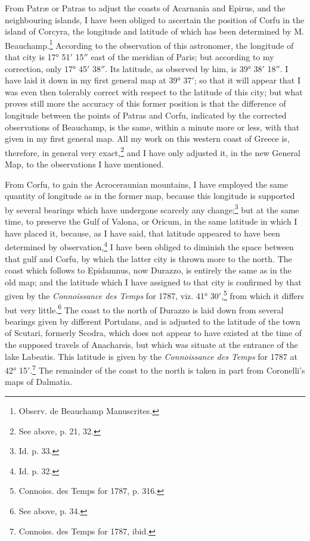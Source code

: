 \documentclass[a4paper, 11pt, oneside, polutonikogreek, english]{article}
\begin{document}
From Patræ or Patras to adjust the coasts of Acarnania and Epirus, and the neighbouring islands, I have been obliged to ascertain the position of Corfu in the island of Corcyra, the longitude and latitude of which has been determined by M. Beauchamp.\footnote{Observ. de Beauchamp Manuscrites.} According to the observation of this astronomer, the longitude of that city is 17° 51$'$ 15$''$ east of the meridian of Paris; but according to my correction, only 17° 45$'$ 38$''$. Its latitude, as observed by him, is 39° 38$'$ 18$''$. I have laid it down in my first general map at 39° 37$'$; so that it will appear that I was even then tolerably correct with respect to the latitude of this city; but what proves still more the accuracy of this former position is that the difference of longitude between the points of Patras and Corfu, indicated by the corrected observations of Beauchamp, is the same, within a minute more or less, with that given in my first general map. All my work on this western coast of Greece is, therefore, in general very exact,\footnote{See above, p. 21, 32.} and I have only adjusted it, in the new General Map, to the observations I have mentioned.

From Corfu, to gain the Acroceraunian mountains, I have employed the same quantity of longitude as in the former map, because this longitude is supported by several bearings which have undergone scarcely any change;\footnote{Id. p. 33.} but at the same time, to preserve the Gulf of Valona, or Oricum, in the same latitude in which I have placed it, because, as I have said, that latitude appeared to have been determined by observation,\footnote{Id. p. 32.} I have been obliged to diminish the space between that gulf and Corfu, by which the latter city is thrown more to the north. The coast which follows to Epidamnus, now Durazzo, is entirely the same as in the old map; and the latitude which I have assigned to that city is confirmed by that given by the \emph{Connoissance des Temps} for 1787, viz. 41° 30$'$,\footnote{Connoiss. des Temps for 1787, p. 316.} from which it differs but very little.\footnote{See above, p. 34.} The coast to the north of Durazzo is laid down from several bearings given by different Portulans, and is adjusted to the latitude of the town of Scutari, formerly Scodra, which does not appear to have existed at the time of the supposed travels of Anacharsis, but which was situate at the entrance of the lake Labeatis. This latitude is given by the \emph{Connoissance des Temps} for 1787 at 42° 15$'$.\footnote{Connoiss. des Temps for 1787, ibid.} The remainder of the coast to the north is taken in part from Coronelli's maps of Dalmatia.
\end{document}
